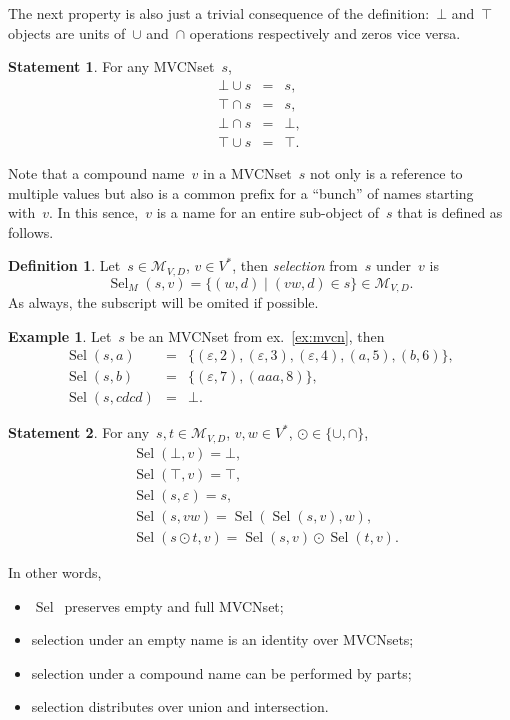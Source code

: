 \documentclass{article}
\theoremstyle{definition}
\newtheorem{Df}{Definition}
\newtheorem{St}{Statement}
\newtheorem{Ex}{Example}
\newcommand{\setcharmvcn}{M}
\newcommand{\setsymbol}[3]{\mathcal{#1}_{#2,#3}}
\newcommand{\setmvcn}[2]{\setsymbol{\setcharmvcn}{#1}{#2}}
\newcommand{\select}{\operatorname{Sel}}
\begin{document}
The next property is also just a trivial consequence of the definition:~$\bot$
and~$\top$ objects are units of~$\cup$ and~$\cap$ operations respectively and
zeros vice versa.
\begin{St}\label{st:mvcn-neutrals}
For any MVCNset~$s$,
\begin{eqnarray*}
  \bot \cup s & = & s,    \\
  \top \cap s & = & s,    \\
  \bot \cap s & = & \bot, \\
  \top \cup s & = & \top.
\end{eqnarray*}
\end{St}

Note that a compound name~$v$ in a MVCNset~$s$ not only is a reference to
multiple values but also is a common prefix for a ``bunch'' of names starting
with~$v$. In this sence,~$v$ is a name for an entire sub-object of~$s$ that is
defined as follows.
\begin{Df}\label{df:mvcn-select}
Let~$s\in\setmvcn{V}{D}$, $v\in V^\ast$, then \emph{selection} from~$s$
under~$v$ is
\[
  \select_\setcharmvcn(s,v) = \{ (w, d) \mid (vw, d)\in s \} \in\setmvcn{V}{D}.
\]
As always, the subscript will be omited if possible.
\end{Df}

\begin{Ex}\label{ex:mvcn-select}
Let~$s$ be an MVCNset from ex.~\ref{ex:mvcn}, then
\begin{eqnarray*}
  \select(s, a) & = & \{
    (\varepsilon, 2),
    (\varepsilon, 3),
    (\varepsilon, 4),
    (a,           5),
    (b,           6)
  \} , \\
  \select(s, b) & = & \{
    (\varepsilon, 7),
    (aaa,         8)
  \} , \\
  \select(s, cdcd) & = & \bot .
\end{eqnarray*}
\end{Ex}

\begin{St}\label{st:mvcn-selection-properties}
For any~$s,t\in\setmvcn{V}{D}$, $v, w\in V^\ast$, $\odot\in\{\cup, \cap\}$,
\begin{eqnarray*}
  & \select(\bot,v) = \bot, \\
  & \select(\top,v) = \top, \\
  & \select(s,\varepsilon) = s, \\
  & \select(s,vw) = \select(\select(s,v), w), \\
  & \select(s\odot t, v) = \select(s,v)\odot \select(t,v).
\end{eqnarray*}
\end{St}
In other words,
\begin{itemize}
\item $\select$~preserves empty and full MVCNset;
\item selection under an empty name is an identity over MVCNsets;
\item selection under a compound name can be performed by parts;
\item selection distributes over union and intersection.
\end{itemize}
\end{document}
